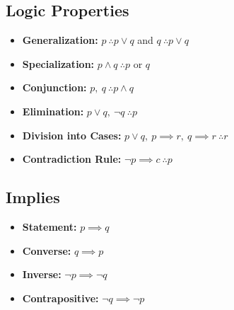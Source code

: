 \documentclass[landscape, letterpaper, 8pt]{extarticle}
\begin{document}
\begin{multicols}{3}
    \section*{Logic Properties}
    \begin{itemize}[noitemsep,nolistsep]
        \item \textbf{Generalization: } $p~\therefore p \lor q$ and $q~\therefore p \lor q$
        \item \textbf{Specialization: } $p \land q~\therefore p$ or $q$
        \item \textbf{Conjunction: } $p,~q~\therefore p \land q$
        \item \textbf{Elimination: } $p \lor q,~\neg q~\therefore p$
        \item \textbf{Division into Cases: } $p \lor q,~p\implies r,~q\implies r~\therefore r$
        \item \textbf{Contradiction Rule: } $\neg p \implies c~\therefore p$
    \end{itemize}
    \subsection*{Implies}
    \begin{itemize}[noitemsep,nolistsep]
        \item \textbf{Statement: } $p \implies q$
        \item \textbf{Converse: } $q \implies p$
        \item \textbf{Inverse: } $\neg p \implies \neg q$
        \item \textbf{Contrapositive: } $\neg q \implies \neg p$
    \end{itemize}

\end{multicols}
\end{document}
